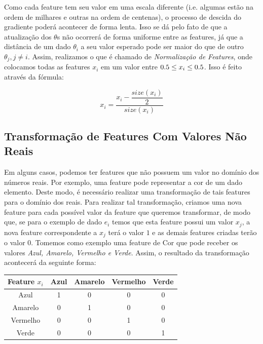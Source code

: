 \documentclass[conference]{IEEEtran}
\begin{document}
Como cada feature tem seu valor em uma escala diferente (i.e. algumas estão na ordem de milhares e outras na ordem de centenas), o processo de descida do gradiente poderá acontecer de forma lenta. Isso se dá pelo fato de que a atualização dos $\theta$s não ocorrerá de forma uniforme entre as features, já que a distância de um dado $\theta_{i}$ a seu valor esperado pode ser maior do que de outro $\theta_{j}, j \neq i$. Assim, realizamos o que é chamado de \textit{Normalização de Features}, onde colocamos todas as features $x_{i}$ em um valor entre $ \-0.5 \leq x_{i} \leq 0.5$. Isso é feito através da fórmula:

\begin{equation} \label{eq:feature_norm}
x_{i} = \dfrac{x_{i} - \dfrac{size(x_{i})}{2}}{size(x_{i})}
\end{equation}

\subsection{Transformação de Features Com Valores Não Reais}

Em alguns casos, podemos ter features que não possuem um valor no domínio dos números reais. Por exemplo, uma feature pode representar a cor de um dado elemento. Deste modo, é necessário realizar uma transformação de tais features para o domínio dos reais. Para realizar tal transformação, criamos uma nova feature para cada possível valor da feature que queremos transformar, de modo que, se para o exemplo de dado $e_{i}$ temos que esta feature possui um valor $x_{j}$, a nova feature correspondente a $x_{j}$ terá o valor $1$ e as demais features criadas terão o valor $0$. Tomemos como exemplo uma feature de Cor que pode receber os valores \textit{Azul, Amarelo, Vermelho e Verde}. Assim, o resultado da transformação acontecerá da seguinte forma:

\begin{table}[H]
\centering
\begin{tabular}{|c|c|c|c|c|}
\hline
Feature $x_{i}$ & Azul & Amarelo & Vermelho & Verde \\ \hline
Azul            & 1    & 0       & 0        & 0     \\ \hline
Amarelo         & 0    & 1       & 0        & 0     \\ \hline
Vermelho        & 0    & 0       & 1        & 0     \\ \hline
Verde           & 0    & 0       & 0        & 1     \\ \hline
\end{tabular}
\end{table}
\end{document}
